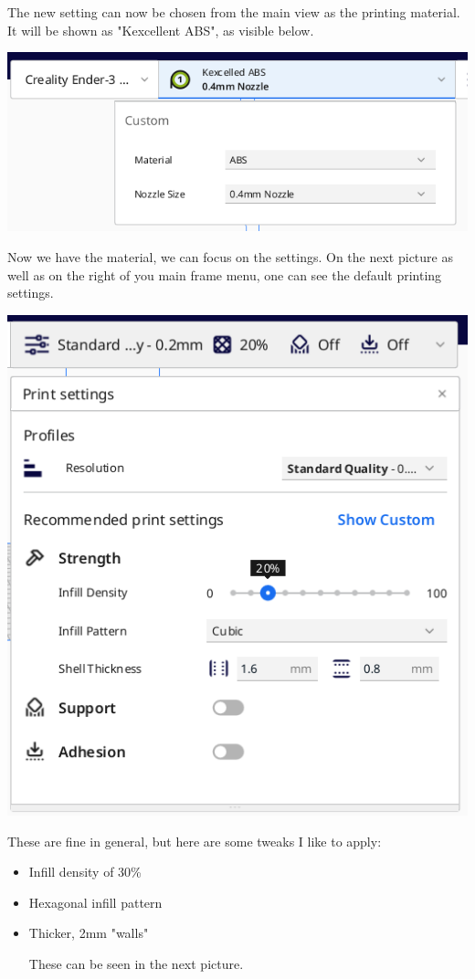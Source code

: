 \documentclass[a4paper,11pt]{article}
\begin{document}
The new setting can now be chosen from the main view as the printing material.
It will be shown as "Kexcellent ABS", as visible below.

\begin{center}
\includegraphics[width=.9\linewidth]{img/cura/6.png}
\end{center}

Now we have the material, we can focus on the settings.
On the next picture as well as on the right of you main frame menu, one
can see the default printing settings.

\begin{center}
\includegraphics[width=.9\linewidth]{img/cura/7.png}
\end{center}

These are fine in general, but here are some tweaks I like to apply:
\begin{itemize}
\item Infill density of 30\%
\item Hexagonal infill pattern
\item Thicker, 2mm "walls"

These can be seen in the next picture.
\end{itemize}
\end{document}
